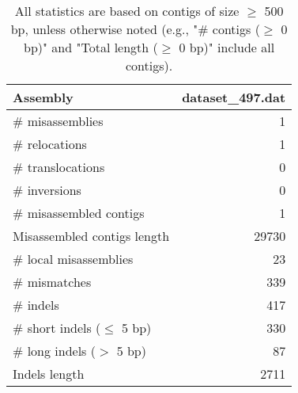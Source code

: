 \documentclass[12pt,a4paper]{article}
\begin{document}
\begin{table}[ht]
\begin{center}
\caption{All statistics are based on contigs of size $\geq$ 500 bp, unless otherwise noted (e.g., "\# contigs ($\geq$ 0 bp)" and "Total length ($\geq$ 0 bp)" include all contigs).}
\begin{tabular}{|l*{1}{|r}|}
\hline
Assembly & dataset\_497.dat \\ \hline
\# misassemblies & 1 \\ \hline
\hspace{5mm}\# relocations & 1 \\ \hline
\hspace{5mm}\# translocations & 0 \\ \hline
\hspace{5mm}\# inversions & 0 \\ \hline
\# misassembled contigs & 1 \\ \hline
Misassembled contigs length & 29730 \\ \hline
\# local misassemblies & 23 \\ \hline
\# mismatches & 339 \\ \hline
\# indels & 417 \\ \hline
\hspace{5mm}\# short indels ($\leq$ 5 bp) & 330 \\ \hline
\hspace{5mm}\# long indels ($>$ 5 bp) & 87 \\ \hline
Indels length & 2711 \\ \hline
\end{tabular}
\end{center}
\end{table}
\end{document}
